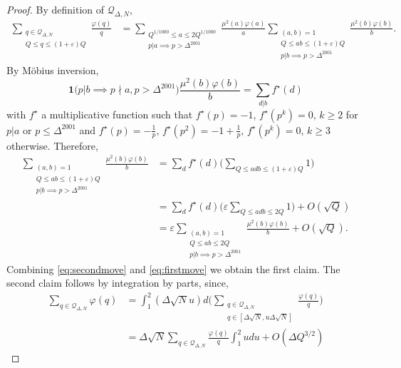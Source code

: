 \documentclass[12pt,reqno]{amsart}
\theoremstyle{plain}
\numberwithin{equation}{section}
\numberwithin{figure}{section}
\theoremstyle{plain}
\theoremstyle{definition}
\theoremstyle{remark}
\begin{document}
\begin{proof}
  By definition of $\mathcal{Q}_{\Delta, N}$,  
  \begin{align} \label{eq:secondmove}
  \sum_{\substack{q \in \mathcal{Q}_{\Delta, N} \\ Q \leq q \leq (1 + \varepsilon) Q}} \frac{\varphi(q)}{q} & = \sum_{\substack{Q^{1/1000} \leq a \leq 2 Q^{1/1000} \\ p | a \implies p > \Delta^{2001}}} \frac{\mu^2(a)\varphi(a)}{a} \sum_{\substack{(a,b) = 1 \\ Q \leq a b \leq (1 + \varepsilon) Q \\ p | b \implies p > \Delta^{2001}}}\frac{\mu^2(b)\varphi(b)}{b}.
  \end{align}
  By M\"{o}bius inversion, 
  $$
  \mathbf{1} \Big ( p | b \implies p \nmid a , p > \Delta^{2001} \Big ) \frac{\mu^2(b) \varphi(b)}{b} = \sum_{d | b} f^{\star}(d)
  $$
  with $f^{\star}$ a multiplicative function such that $f^{\star}(p) = -1$, $f^{\star}(p^k) = 0$, $k \geq 2$ for $p | a$ or $p \leq \Delta^{2001}$ and $f^{\star}(p) = - \frac{1}{p}$, $f^{\star}(p^2) = -1 + \frac{1}{p}$, $f^{\star}(p^k) = 0$, $k \geq 3$ otherwise. Therefore, 
  \begin{align} \label{eq:firstmove}
  \sum_{\substack{(a,b) = 1 \\ Q \leq a b \leq (1 + \varepsilon) Q \\ p | b \implies p > \Delta^{2001}}} \frac{\mu^2(b)\varphi(b)}{b} & = \sum_{d} f^{\star}(d) \Big ( \sum_{Q \leq a d b \leq (1 + \varepsilon)Q } 1 \Big ) \\ \nonumber & = \sum_{d} f^{\star}(d) \Big ( \varepsilon \sum_{Q \leq a d b \leq 2Q} 1 \Big ) + O(\sqrt{Q}) \\ \nonumber & = \varepsilon \sum_{\substack{(a,b) = 1 \\ Q \leq a b \leq 2 Q \\ p | b \implies p > \Delta^{2001}}} \frac{\mu^2(b)\varphi(b)}{b} + O(\sqrt{Q}).
  \end{align}
  Combining \eqref{eq:secondmove} and \eqref{eq:firstmove} we obtain the first claim. The second claim follows by integration by parts, since, 
  \begin{align*}
  \sum_{q \in \mathcal{Q}_{\Delta, N}} \varphi(q) & =  \int_{1}^{2} (\Delta \sqrt{N} u) d \Big ( \sum_{\substack{q \in \mathcal{Q}_{\Delta, N} \\ q \in [\Delta \sqrt{N}, u \Delta \sqrt{N}]}} \frac{\varphi(q)}{q} \Big ) \\ & = \Delta \sqrt{N} \sum_{q \in \mathcal{Q}_{\Delta, N}} \frac{\varphi(q)}{q} \int_{1}^{2} u du + O(\Delta Q^{3/2})

\end{align*}
\end{proof}
\end{document}
